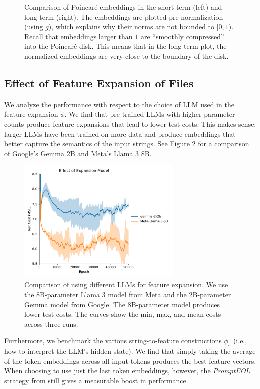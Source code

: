 \documentclass{article}
\begin{document}
\begin{figure}[H]
\begin{minipage}{0.35\textwidth}
  \end{minipage}
  \caption{Comparison of Poincaré embeddings in the short term (left) and long term (right). The embeddings are plotted pre-normalization (using $g$), which explains why their norms are not bounded to $[0, 1)$. Recall that embeddings larger than $1$ are ``smoothly compressed'' into the Poincaré disk. This means that in the long-term plot, the normalized embeddings are very close to the boundary of the disk.}
  \label{fig:short-and-long-term-embeddings}
\end{figure}

\subsection{Effect of Feature Expansion of Files}

We analyze the performance with respect to the choice of LLM used in the feature expansion $\phi$. We find that pre-trained LLMs with higher parameter counts produce feature expansions that lead to lower test costs. This makes sense: larger LLMs have been trained on more data and produce embeddings that better capture the semantics of the input strings. See Figure \ref{fig:expansion-model} for a comparison of Google's Gemma 2B and Meta's Llama 3 8B.

\begin{figure}[H]
  \centering
  \includegraphics[width=0.7\textwidth]{figures/expansion_model.pdf}
  \caption{Comparison of using different LLMs for feature expansion. We use the 8B-parameter Llama 3 model from Meta and the 2B-parameter Gemma model from Google. The 8B-parameter model produces lower test costs. The curves show the min, max, and mean costs across three runs.}
  \label{fig:expansion-model}
\end{figure}

Furthermore, we benchmark the various string-to-feature constructions $\phi_s$ (i.e., how to interpret the LLM's hidden state). We find that simply taking the average of the token embeddings across all input tokens produces the best feature vectors. When choosing to use just the last token embeddings, however, the \emph{PromptEOL} strategy from \cite{jiang2023scalingsentenceembeddingslarge} still gives a measurable boost in performance.
\end{document}
